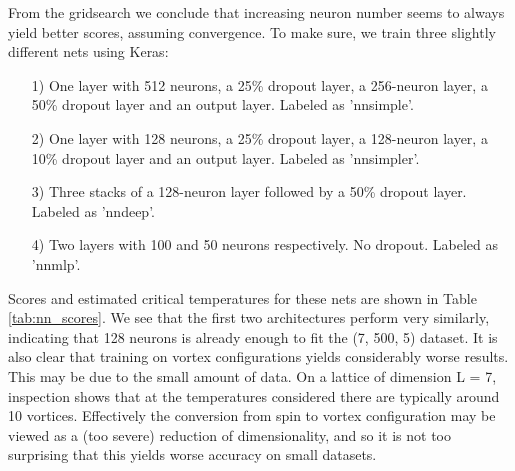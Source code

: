 \documentclass[]{article}
\begin{document}
From the gridsearch we conclude that increasing neuron number seems to always yield better scores, assuming convergence. To make sure, we train three slightly different nets using Keras: 
\begin{itemize}
	\item[1)] One layer with 512 neurons, a 25\% dropout layer, a 256-neuron layer, a 50\% dropout layer and an output layer. Labeled as 'nnsimple'.
	\item[2)] One layer with 128 neurons, a 25\% dropout layer, a 128-neuron layer, a 10\% dropout layer and an output layer. Labeled as 'nnsimpler'.
	\item[3)] Three stacks of a 128-neuron layer followed by a 50\% dropout layer. \newline Labeled as 'nndeep'.
	\item[4)] Two layers with 100 and 50 neurons respectively. No dropout. Labeled as 'nnmlp'.
\end{itemize}

Scores and estimated critical temperatures for these nets are shown in Table \ref{tab:nn_scores}. We see that the first two architectures perform very similarly, indicating that 128 neurons is already enough to fit the (7, 500, 5) dataset. It is also clear that training on vortex configurations yields considerably worse results. This may be due to the small amount of data. On a lattice of dimension L = 7, inspection shows that at the temperatures considered there are typically around 10 vortices. Effectively the conversion from spin to vortex configuration may be viewed as a (too severe) reduction of dimensionality, and so it is not too surprising that this yields worse accuracy on small datasets.
\end{document}
